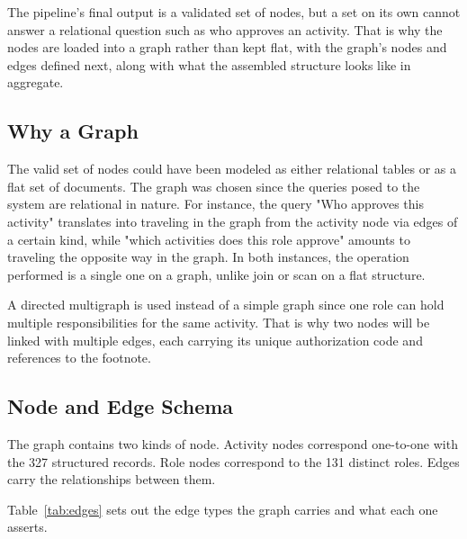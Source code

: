 The pipeline's final output is a validated set of nodes, but a set on its own cannot answer
a relational question such as who approves an activity. That is why the nodes are loaded
into a graph rather than kept flat, with the graph's nodes and edges defined next, along
with what the assembled structure looks like in aggregate.

\subsection{Why a Graph}

The valid set of nodes could have been modeled as either relational tables or as a flat set of documents\citep{hogan2021kg}. The graph was chosen since the queries posed to the system are relational in nature. For instance, the query "Who approves this activity" translates into traveling in the graph from the activity node via edges of a certain kind, while "which activities does this role approve" amounts to traveling the opposite way in the graph. In both instances, the operation performed is a single one on a graph, unlike join or scan on a flat structure.

A directed multigraph is used instead of a simple graph since one role can hold multiple responsibilities for the same activity. That is why two nodes will be linked with multiple edges, each carrying its unique authorization code and references to the footnote.

\subsection{Node and Edge Schema}

The graph contains two kinds of node. Activity nodes correspond one-to-one with the 327 structured records. Role nodes correspond to the 131 distinct roles. Edges carry the relationships between them.

Table~\ref{tab:edges} sets out the edge types the graph carries and what each one asserts.

